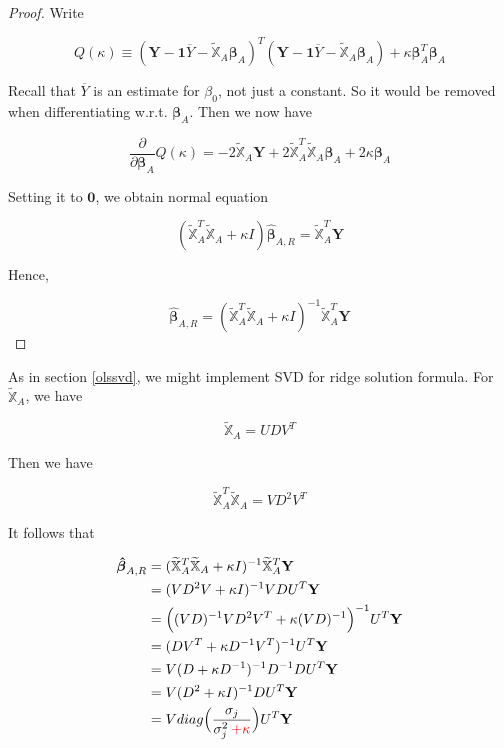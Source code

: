 \documentclass[]{book}
\theoremstyle{definition}
\theoremstyle{definition}
\theoremstyle{definition}
\theoremstyle{remark}
\let\BeginKnitrBlock\begin \let\EndKnitrBlock\end
\begin{document}
\BeginKnitrBlock{proof}
{}Write

\[Q(\kappa) \equiv (\mathbf{Y} - \mathbf{1} \overline{Y} - \widetilde{\mathbb{X}}_A \boldsymbol\beta_A)^T (\mathbf{Y} - \mathbf{1} \overline{Y} - \widetilde{\mathbb{X}}_A \boldsymbol\beta_A) + \kappa \boldsymbol\beta_A^T \boldsymbol\beta_A\]

Recall that \(\overline{Y}\) is an estimate for \(\beta_0\), not just a constant. So it would be removed when differentiating w.r.t. \(\boldsymbol\beta_A\). Then we now have

\[
\frac{\partial}{\partial \boldsymbol\beta_A} Q(\kappa) = -2 \widetilde{\mathbb{X}}_A \mathbf{Y} + 2 \widetilde{\mathbb{X}}_A^T \widetilde{\mathbb{X}}_A \boldsymbol\beta_A + 2 \kappa \boldsymbol\beta_A
\]

Setting it to \(\mathbf{0}\), we obtain normal equation

\begin{equation}
  (\widetilde{\mathbb{X}}_A^T \widetilde{\mathbb{X}}_A + \kappa I) \boldsymbol{\hat\beta}_{A, R} = \widetilde{\mathbb{X}}_A^T \mathbf{Y}
  \label{eq:ridgenormal}
\end{equation}

Hence,

\[\boldsymbol{\hat\beta}_{A, R} = (\widetilde{\mathbb{X}}_A^T \widetilde{\mathbb{X}}_A + \kappa I)^{-1}\widetilde{\mathbb{X}}_A^T \mathbf{Y}\]
\EndKnitrBlock{proof}

As in section \ref{olssvd}, we might implement SVD for ridge solution formula. For \(\widetilde{\mathbb{X}}_A\), we have

\[\widetilde{\mathbb{X}}_A = UDV^T\]

Then we have

\[\widetilde{\mathbb{X}}_A^T \widetilde{\mathbb{X}}_A = VD^2 V^T\]

It follows that

\begin{equation}
  \begin{split}
    \boldsymbol{\hat\beta}_{A, R} & = (\widetilde{\mathbb{X}}_A^T \widetilde{\mathbb{X}}_A + \kappa I)^{-1}\widetilde{\mathbb{X}}_A^T \mathbf{Y} \\
    & = (VD^2V + \kappa I)^{-1} VDU^T \mathbf{Y} \\
    & = \Big( (VD)^{-1} VD^2 V^T + \kappa (VD)^{-1} \Big)^{-1} U^T \mathbf{Y} \\
    & = (DV^T + \kappa D^{-1}V^T)^{-1} U^T \mathbf{Y} \\
    & = V ( D + \kappa D^{-1})^{-1} D^{-1}D U^T \mathbf{Y} \\
    & = V ( D^2 + \kappa I)^{-1} D U^T \mathbf{Y} \\
    & = V diag\Big( \frac{\sigma_j}{\sigma_j^2 \: {\color{red}{+ \kappa}}} \Big) U^T \mathbf{Y}
  \end{split}
  \label{eq:ridgesvd}
\end{equation}
\end{document}
